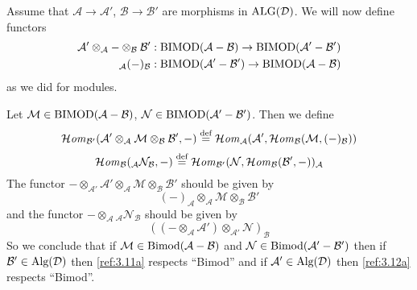 \documentclass{amsproc}
\def\Ascr{{\mathcal A}}
\def\Bscr{{\mathcal B}}
\def\Dscr{{\mathcal D}}
\def\Hscr{{\mathcal H}}
\def\Mscr{{\mathcal M}}
\def\Nscr{{\mathcal N}}
\def\HHom{\operatorname {\Hscr \mathit{om}}}
\def\Bimod{\mathop{\text{Bimod}}}
\def\BIMOD{\mathop{\text{BIMOD}}}
\def\Alg{\mathop{\text{Alg}}}
\def\ALG{\mathop{\text{ALG}}}
\def\HHom{\operatorname {\Hscr \mathit{om}}}
\def\r{\rightarrow}
\let\oldtext\text
\def\text#1{\oldtext{\upshape #1}}
\theoremstyle{definition}
\theoremstyle{remark}
\numberwithin{equation}{section}
\numberwithin{table}{section}
\numberwithin{figure}{section}
\begin{document}
Assume that $\Ascr\r \Ascr'$, $\Bscr\r \Bscr'$ are morphisms in
$\ALG(\Dscr)$. We will now define functors
\begin{align}
\Ascr'\otimes_\Ascr-\otimes_\Bscr\Bscr':\BIMOD(\Ascr-\Bscr)\r
\BIMOD(\Ascr'-\Bscr') \label{ref:3.11a}\\
{}_\Ascr(-)_\Bscr:\BIMOD(\Ascr'-\Bscr')\r \BIMOD (\Ascr-\Bscr)
\label{ref:3.12a}
\end{align}
as we did for modules.

Let $\Mscr\in\BIMOD(\Ascr-\Bscr)$,
$\Nscr\in\BIMOD(\Ascr'-\Bscr')$. Then we define
\[
\HHom_{\Bscr'}(\Ascr'\otimes_\Ascr\Mscr\otimes_\Bscr\Bscr',-)\overset{
\text{def}}{=} \HHom_\Ascr(\Ascr',\HHom_\Bscr(\Mscr,(-)_\Bscr))
\]
\begin{equation}
\label{ref:3.13a}
\HHom_\Bscr({}_\Ascr\Nscr_\Bscr,-)\overset{
\text{def}}{=}
\HHom_{\Bscr'}(\Nscr,\HHom_\Bscr(\Bscr',-))_\Ascr
\end{equation}
The functor
$-\otimes_{\Ascr'}\Ascr'\otimes_\Ascr\Mscr\otimes_\Bscr\Bscr'$ should
be given by
\[
(-)_\Ascr\otimes_\Ascr\Mscr\otimes_\Bscr\Bscr'
\]
and the functor $-\otimes_\Ascr{}_\Ascr\Nscr_\Bscr$ should be given by
\begin{equation}
\label{ref:3.14a}
((-\otimes_\Ascr\Ascr')\otimes_{\Ascr'}\Nscr)_\Bscr
\end{equation}
So we conclude that if $\Mscr\in \Bimod(\Ascr-\Bscr)$ and
$\Nscr\in\Bimod(\Ascr'-\Bscr')$ then if $\Bscr'\in \Alg(\Dscr)$ then
\eqref{ref:3.11a} respects ``Bimod'' and if $\Ascr'\in \Alg(\Dscr)$ then
\eqref{ref:3.12a} respects ``Bimod''.
\end{document}
